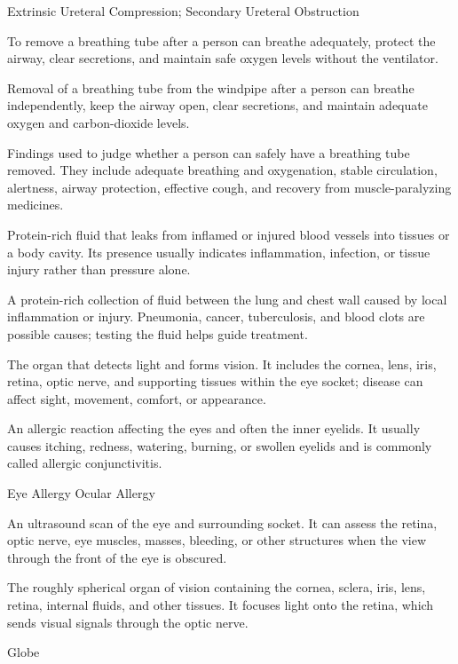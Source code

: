 \synonyms
Extrinsic Ureteral Compression; Secondary Ureteral Obstruction

 To remove a breathing tube after a person can breathe adequately, protect the airway, clear secretions, and maintain safe oxygen levels without the ventilator.

 Removal of a breathing tube from the windpipe after a person can breathe independently, keep the airway open, clear secretions, and maintain adequate oxygen and carbon-dioxide levels.

 Findings used to judge whether a person can safely have a breathing tube removed. They include adequate breathing and oxygenation, stable circulation, alertness, airway protection, effective cough, and recovery from muscle-paralyzing medicines.

 Protein-rich fluid that leaks from inflamed or injured blood vessels into tissues or a body cavity. Its presence usually indicates inflammation, infection, or tissue injury rather than pressure alone.

 A protein-rich collection of fluid between the lung and chest wall caused by local inflammation or injury. Pneumonia, cancer, tuberculosis, and blood clots are possible causes; testing the fluid helps guide treatment.

 The organ that detects light and forms vision. It includes the cornea, lens, iris, retina, optic nerve, and supporting tissues within the eye socket; disease can affect sight, movement, comfort, or appearance.

 An allergic reaction affecting the eyes and often the inner eyelids. It usually causes itching, redness, watering, burning, or swollen eyelids and is commonly called allergic conjunctivitis.

\synonyms
Eye Allergy
Ocular Allergy

 An ultrasound scan of the eye and surrounding socket. It can assess the retina, optic nerve, eye muscles, masses, bleeding, or other structures when the view through the front of the eye is obscured.

 The roughly spherical organ of vision containing the cornea, sclera, iris, lens, retina, internal fluids, and other tissues. It focuses light onto the retina, which sends visual signals through the optic nerve.

\synonyms
Globe


